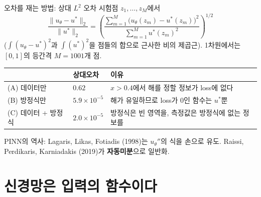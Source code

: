 \documentclass[aspectratio=169,11pt]{beamer}
\newcommand{\figcap}[1]{\par\vskip1mm{\centering\footnotesize\color{black!70}#1\par}}
\begin{document}
\begin{frame}{오차를 재는 방법: 상대 $L^2$ 오차}
시험점 $z_1,\dots,z_M$에서
\[
\frac{\|u_\theta-u^*\|_2}{\|u^*\|_2}
=\left(\frac{\sum_{m=1}^M\big(u_\theta(z_m)-u^*(z_m)\big)^2}{\sum_{m=1}^M u^*(z_m)^2}\right)^{1/2}
\]
($\int(u_\theta-u^*)^2$과 $\int(u^*)^2$을 점들의 합으로 근사한 비의 제곱근). 1차원에서는 $[0,1]$의 등간격 $M=1001$개 점.

\vskip1mm
\begin{center}
\small
\begin{tabular}{@{}lll@{}}
\toprule
& 상대오차 & 이유 \\
\midrule
(A) 데이터만 & $0.62$ & $x>0.4$에서 해를 정할 정보가 loss에 없다 \\
(B) 방정식만 & $5.9\times10^{-5}$ & 해가 유일하므로 loss가 $0$인 함수는 $u^*$뿐 \\
(C) 데이터 + 방정식 & $2.0\times10^{-5}$ & 방정식은 빈 영역을, 측정값은 방정식에 없는 정보를 \\
\bottomrule
\end{tabular}
\end{center}

\figcap{PINN의 역사: Lagaris, Likas, Fotiadis (1998)는 $u_\theta''$의 식을 손으로 유도. Raissi, Perdikaris, Karniadakis (2019)가 \textbf{자동미분}으로 일반화.}
\end{frame}

\section{신경망은 입력의 함수이다}
\end{document}
